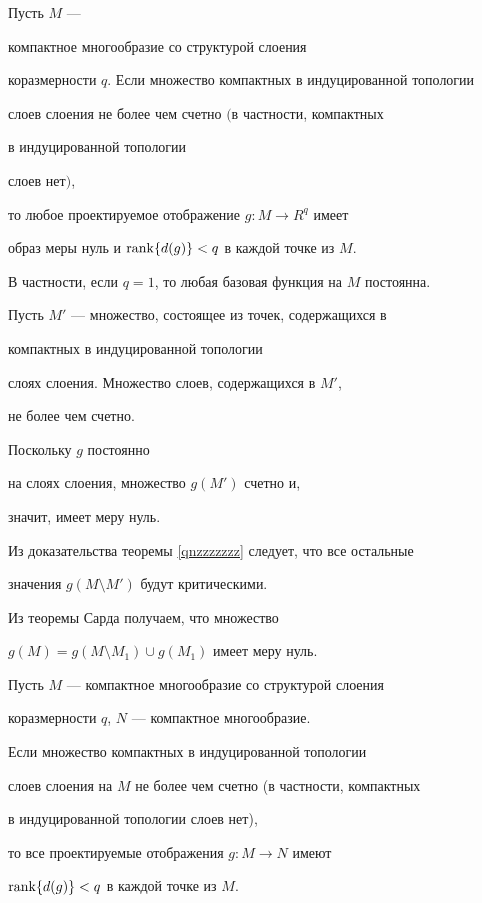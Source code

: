 \begin{thm} \label{scq}


Пусть $M$ ---


компактное многообразие со структурой слоения


коразмерности $q$. Если множество компактных в индуцированной топологии


слоев слоения не более чем счетно $($в частности, компактных


в индуцированной топологии


слоев нет$)$,


то любое проектируемое отображение $g : M \to R^q$ имеет


образ меры нуль и $\operatorname{rank}\{d(g)\} < q$ в каждой точке из $M$.





В частности, если $q=1$, то любая базовая функция на $M$ постоянна.


\end{thm}





Пусть $M'$ --- множество, состоящее из точек, содержащихся в


компактных в индуцированной топологии


слоях слоения. Множество слоев, содержащихся в $M'$,


не более чем счетно.


Поскольку $g$ постоянно


на слоях слоения, множество $ g(M') $ счетно и,


значит, имеет меру нуль.


Из доказательства теоремы \ref{qnzzzzzzz} следует, что все остальные


значения $g(M \setminus M')$ будут критическими.


Из теоремы Сарда получаем, что множество


$g(M) = g(M \setminus M_1) \cup g(M_1)$ имеет меру нуль.





\begin{cor} \label{}


Пусть $M$ --- компактное многообразие со структурой слоения


коразмерности $q$, $N$ --- компактное многообразие.


Если множество компактных в индуцированной топологии


слоев слоения на $M$ не более чем счетно (в частности, компактных


в индуцированной топологии слоев нет),


то все проектируемые отображения $g : M \to N$ имеют


$\operatorname{rank}\{d(g)\} < q$ в каждой точке из $M$.


\end{cor}





